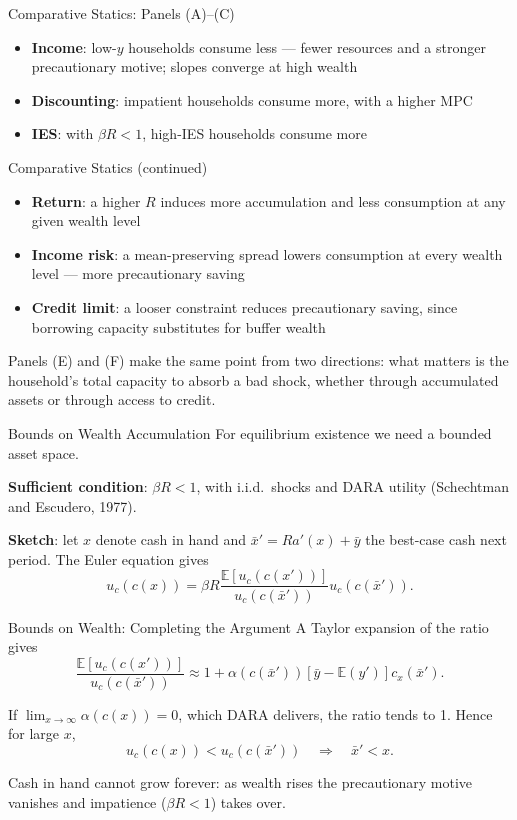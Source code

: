 \documentclass[blue]{beamer}
\newcommand{\E}{\mathbb{E}}
\begin{document}
	\begin{frame}{Comparative Statics: Panels (A)--(C)}
		\begin{itemize}
			\item[(A)] \textbf{Income}: low-$y$ households consume less --- fewer resources and a stronger precautionary motive; slopes converge at high wealth
			\item[(B)] \textbf{Discounting}: impatient households consume more, with a higher MPC
			\item[(C)] \textbf{IES}: with $\beta R < 1$, high-IES households consume more
		\end{itemize}
	\end{frame}
	
	\begin{frame}{Comparative Statics (continued)}
		\begin{itemize}
			\item[(D)] \textbf{Return}: a higher $R$ induces more accumulation and less consumption at any given wealth level
			\item[(E)] \textbf{Income risk}: a mean-preserving spread lowers consumption at every wealth level --- more precautionary saving
			\item[(F)] \textbf{Credit limit}: a looser constraint reduces precautionary saving, since borrowing capacity substitutes for buffer wealth
		\end{itemize}
		
		\bigskip
		Panels (E) and (F) make the same point from two directions: what matters is the household's total capacity to absorb a bad shock, whether through accumulated assets or through access to credit.
	\end{frame}
	
	\begin{frame}{Bounds on Wealth Accumulation}
		For equilibrium existence we need a bounded asset space.
		
		\bigskip
		\textbf{Sufficient condition}: $\beta R < 1$, with i.i.d.\ shocks and DARA utility (Schechtman and Escudero, 1977).
		
		\bigskip
		\textbf{Sketch}: let $x$ denote cash in hand and $\bar{x}' = Ra'(x) + \bar{y}$ the best-case cash next period. The Euler equation gives
		\[
		u_c(c(x)) = \beta R \frac{\E[u_c(c(x'))]}{u_c(c(\bar{x}'))} u_c(c(\bar{x}')).
		\]
	\end{frame}
	
	\begin{frame}{Bounds on Wealth: Completing the Argument}
		A Taylor expansion of the ratio gives
		\[
		\frac{\E[u_c(c(x'))]}{u_c(c(\bar{x}'))} \approx 1 + \alpha(c(\bar{x}'))[\bar{y} - \E(y')] c_x(\bar{x}').
		\]
		
		If $\lim_{x \to \infty} \alpha(c(x)) = 0$, which DARA delivers, the ratio tends to 1. Hence for large $x$,
		\[
		u_c(c(x)) < u_c(c(\bar{x}')) \quad \Rightarrow \quad \bar{x}' < x.
		\]
		
		\bigskip
		Cash in hand cannot grow forever: as wealth rises the precautionary motive vanishes and impatience ($\beta R < 1$) takes over.
	\end{frame}
	
\end{document}
